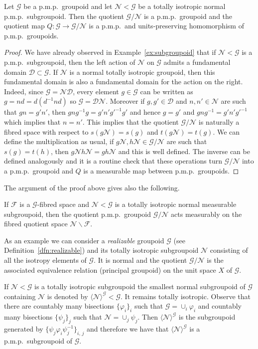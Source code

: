 \documentclass[AHL,Unicode,longabstracts,published]{cedram}
\newcommand{\cn}{\mathcal{N}}
\newcommand{\cg}{\mathcal{G}}
\newcommand{\cf}{\mathcal{F}}
\newcommand{\cd}{\mathcal{D}}
\newcommand{\ph}{\varphi}
\newcommand{\pmp}{p.m.p.\ }
\begin{document}
\begin{prop}\label{prop: quot groupoid}
Let $\cg$ be a \pmp groupoid and let $\cn<\cg$ be a totally isotropic normal \pmp subgroupoid. Then the quotient $\cg/\cn$ is a \pmp grou\-poid and the quotient map $Q:\cg\rightarrow \cg/\cn$ is a \pmp and units-preserving homomorphism of \pmp groupoids.
\end{prop}
\begin{proof}
We have already observed in Example~\ref{ex:subgroupoid} that if $\cn<\cg$ is a \pmp subgroupoid, then the left action of $\cn$ on $\cg$ admits a fundamental domain $\cd\subset \cg$. If $\cn$ is a normal totally isotropic groupoid, then this fundamental domain is also a fundamental domain for the action on the right. Indeed, since $\cg = \cn \cd$, every element $g \in \cg$ can be written as $g = nd = d (d^{-1} n d)$ so $\cg = \cd \cn$. Moreover if $g,g'\in \cd$ and $n,n'\in \cn$ are such that $gn=g'n'$, then $gng^{-1}g=g' n'g'^{-1}g'$ and hence $g=g'$ and $gng^{-1}=g'n'g'^{-1}$ which implies that $n=n'$. This implies that the quotient $\cg/\cn$ is naturally a fibred space with respect to $s(g\cn)=s(g)$ and $t(g\cn)=t(g)$. We can define the multiplication as usual, if $g\cn,h\cn\in\cg/\cn$ are such that $s(g)=t(h)$, then $g\cn h\cn=gh\cn$ and this is well defined. The inverse can be defined analogously and it is a routine check that these operations turn $\cg/\cn$ into a \pmp groupoid and $Q$ is a measurable map between \pmp groupoids.
\end{proof}

The argument of the proof above gives also the following.

\begin{exam}\label{ex: quotient fibred space}
If $\cf$ is a $\cg$-fibred space and $\cn<\cg$ is a totally isotropic normal measurable subgroupoid, then the quotient \pmp groupoid $\cg/\cn$ acts measurably on the fibred quotient space $\cn\backslash \cf$.
\end{exam}

As an example we can consider a \emph{realizable} groupoid $\cg$ (see Definition~\ref{dfn:realizable}) and its totally isotropic subgroupoid $\cn$ consisting of all the isotropy elements of $\cg$. It is normal and the quotient $\cg/\cn$ is the associated equivalence relation (principal groupoid) on the unit space $X$ of $\cg$.

If $\cn<\cg$ is a totally isotropic subgroupoid the smallest normal subgroupoid of $\cg$ containing $\cn$ is denoted by $\langle\cn\rangle^\cg <\cg$. It remains totally isotropic. Observe that there are countably many bisections $\{\ph_i\}_i$ such that $\cg=\cup_i \ph_i$ and countably many bisections $\{\psi_j\}_j$ such that $\cn=\cup_j \psi_j$. Then $\langle\cn\rangle^\cg$ is the subgroupoid generated by $\{\psi_j\ph_i\psi_j^{-1}\}_{i,\,j}$ and therefore we have that $\langle\cn\rangle^\cg$ is a \pmp subgroupoid of $\cg$.
\end{document}
